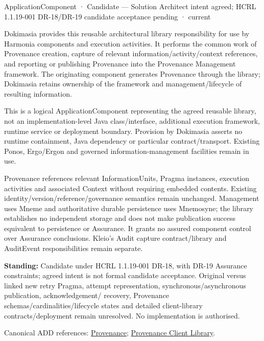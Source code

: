 \label{element:171f05d188384cedb7d5c493eeaee519}
{\small ApplicationComponent · Candidate — Solution Architect intent agreed; HCRL 1.1.19-001 DR-18/DR-19 candidate acceptance pending · current}\par

Dokimasia provides this reusable architectural library responsibility for use by
Harmonia components and execution activities. It performs the common work of
Provenance creation, capture of relevant information/activity/context references,
and reporting or publishing Provenance into the Provenance Management framework.
The originating component generates Provenance through the library; Dokimasia
retains ownership of the framework and management/lifecycle of resulting information.



This is a logical ApplicationComponent representing the agreed reusable library,
not an implementation-level Java class/interface, additional execution framework,
runtime service or deployment boundary. Provision by Dokimasia asserts no runtime
containment, Java dependency or particular contract/transport. Existing Ponos,
Ergo/Ergon and governed information-management facilities remain in use.



Provenance references relevant InformationUnits, Pragma instances, execution
activities and associated Context without requiring embedded contents. Existing
identity/version/reference/governance semantics remain unchanged. Management uses
Mneme and authoritative durable persistence uses Mnemosyne; the library establishes
no independent storage and does not make publication success equivalent to persistence
or Assurance. It grants no assured component control over Assurance conclusions.
Kleio's Audit capture contract/library and AuditEvent responsibilities remain separate.



\textbf{Standing:} Candidate under HCRL 1.1.19-001 DR-18, with DR-19 Assurance constraints;
agreed intent is not formal candidate acceptance. Original versus linked new retry
Pragma, attempt representation, synchronous/asynchronous publication, acknowledgement/
recovery, Provenance schemas/cardinalities/lifecycle states and detailed client-library
contracts/deployment remain unresolved. No implementation is authorised.



Canonical ADD references: \hyperref[element:e282811b51274649816566aac7edeb8a]{Provenance}; \hyperref[element:171f05d188384cedb7d5c493eeaee519]{Provenance Client Library}.



